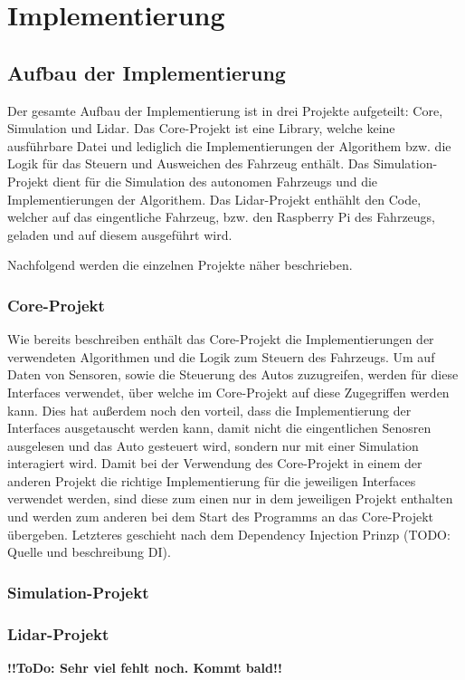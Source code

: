 \section{Implementierung}

\subsection{Aufbau der Implementierung}

Der gesamte Aufbau der Implementierung ist in drei Projekte aufgeteilt: Core, Simulation und Lidar. 
Das Core-Projekt ist eine Library, welche keine ausführbare Datei und lediglich die Implementierungen der Algorithem bzw. die Logik für das Steuern und Ausweichen des Fahrzeug enthält. 
Das Simulation-Projekt dient für die Simulation des autonomen Fahrzeugs und die Implementierungen der Algorithem. 
Das Lidar-Projekt enthählt den Code, welcher auf das eingentliche Fahrzeug, bzw. den Raspberry Pi des Fahrzeugs, geladen und auf diesem ausgeführt wird. 

Nachfolgend werden die einzelnen Projekte näher beschrieben. 

\subsubsection{Core-Projekt}

Wie bereits beschreiben enthält das Core-Projekt die Implementierungen der verwendeten Algorithmen und die Logik zum Steuern des Fahrzeugs. 
Um auf Daten von Sensoren, sowie die Steuerung des Autos zuzugreifen, werden für diese Interfaces verwendet, über welche im Core-Projekt auf diese Zugegriffen werden kann. 
Dies hat außerdem noch den vorteil, dass die Implementierung der Interfaces ausgetauscht werden kann, 
damit nicht die eingentlichen Senosren ausgelesen und das Auto gesteuert wird, sondern nur mit einer Simulation interagiert wird. 
Damit bei der Verwendung des Core-Projekt in einem der anderen Projekt die richtige Implementierung für die jeweiligen Interfaces verwendet werden, 
sind diese zum einen nur in dem jeweiligen Projekt enthalten und werden zum anderen bei dem Start des Programms an das Core-Projekt übergeben. 
Letzteres geschieht nach dem Dependency Injection Prinzp (TODO: Quelle und beschreibung DI).

\subsubsection{Simulation-Projekt}

\subsubsection{Lidar-Projekt}



\LARGE\textbf{!!ToDo: Sehr viel fehlt noch. Kommt bald!!}\normalsize

\newpage
